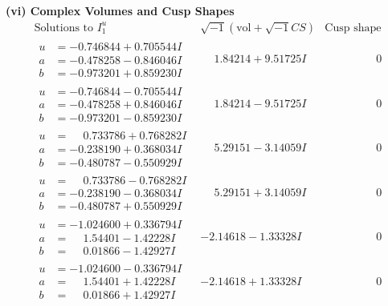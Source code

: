 \documentclass[1p]{elsarticle_modified}
\theoremstyle{definition}
\newcommand{\I}{\sqrt{-1}}
\begin{document}
\newpage\flushleft \textbf{(vi) Complex Volumes and Cusp Shapes}
$$\begin{array}{c|c|c}  
\text{Solutions to }I^u_{1}& \I (\text{vol} + \sqrt{-1}CS) & \text{Cusp shape}\\
 \hline 
\begin{aligned}
u &= -0.746844 + 0.705544 I \\
a &= -0.478258 - 0.846046 I \\
b &= -0.973201 + 0.859230 I\end{aligned}
 & \phantom{-}1.84214 + 9.51725 I & \phantom{-0.000000 } 0 \\ \hline\begin{aligned}
u &= -0.746844 - 0.705544 I \\
a &= -0.478258 + 0.846046 I \\
b &= -0.973201 - 0.859230 I\end{aligned}
 & \phantom{-}1.84214 - 9.51725 I & \phantom{-0.000000 } 0 \\ \hline\begin{aligned}
u &= \phantom{-}0.733786 + 0.768282 I \\
a &= -0.238190 + 0.368034 I \\
b &= -0.480787 - 0.550929 I\end{aligned}
 & \phantom{-}5.29151 - 3.14059 I & \phantom{-0.000000 } 0 \\ \hline\begin{aligned}
u &= \phantom{-}0.733786 - 0.768282 I \\
a &= -0.238190 - 0.368034 I \\
b &= -0.480787 + 0.550929 I\end{aligned}
 & \phantom{-}5.29151 + 3.14059 I & \phantom{-0.000000 } 0 \\ \hline\begin{aligned}
u &= -1.024600 + 0.336794 I \\
a &= \phantom{-}1.54401 - 1.42228 I \\
b &= \phantom{-}0.01866 - 1.42927 I\end{aligned}
 & -2.14618 - 1.33328 I & \phantom{-0.000000 } 0 \\ \hline\begin{aligned}
u &= -1.024600 - 0.336794 I \\
a &= \phantom{-}1.54401 + 1.42228 I \\
b &= \phantom{-}0.01866 + 1.42927 I\end{aligned}
 & -2.14618 + 1.33328 I & \phantom{-0.000000 } 0 \\ \hline\begin{aligned}

\end{aligned}
\end{array}$$
\end{document}
